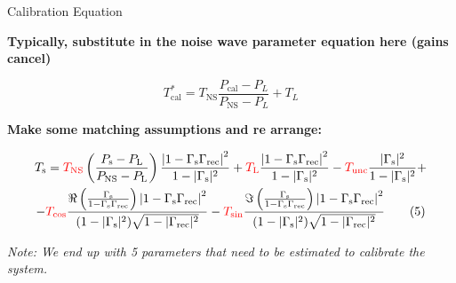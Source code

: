 \documentclass[aspectratio=169]{beamer}
\begin{document}
\begin{frame}{\small{Calibration Equation}}

	\vspace{0.2cm} %

	\textbf{Typically, substitute in the noise wave parameter equation here (gains cancel)}

	\vspace{0.2cm} %

	{\tiny
		\begin{equation}
			T_{\text{cal}}^* = T_{\text{NS}} \frac{P_{\text{cal}} - P_L}{P_{\text{NS}} - P_L} + T_L \tag{4}
		\end{equation}
	}

	\vspace{0.1cm} %

	\textbf{Make some matching assumptions and re arrange:}

	\vspace{0.1cm} %

	{\tiny
		\begin{multline}
			T_\mathrm{s} = \textcolor{red}{T_\mathrm{NS}}\left(\frac{P_\mathrm{s} - P_\mathrm{L}}{P_\mathrm{NS} - P_\mathrm{L}}\right)\frac{\left|1 - \Gamma_\mathrm{s}\Gamma_\mathrm{rec}\right|^2}{1 - |\Gamma_\mathrm{s}|^2} + \textcolor{red}{T_\mathrm{L}}\frac{\left|1 - \Gamma_\mathrm{s}\Gamma_\mathrm{rec}\right|^2}{1 - |\Gamma_\mathrm{s}|^2} - \textcolor{red}{T_\mathrm{unc}} \frac{|\Gamma_\mathrm{s}|^2}{1 - |\Gamma_\mathrm{s}|^2} +  \\
			-\textcolor{red}{T_\mathrm{cos}} \frac{\Re \left( \frac{\Gamma_\mathrm{s}}{1 - \Gamma_\mathrm{s}\Gamma_\mathrm{rec}} \right)\left|1 - \Gamma_\mathrm{s}\Gamma_\mathrm{rec}\right|^2}{(1 - |\Gamma_\mathrm{s}|^2) \sqrt{1 - |\Gamma_\mathrm{rec}|^2}}  -\textcolor{red}{T_\mathrm{sin}} \frac{\Im \left( \frac{\Gamma_\mathrm{s}}{1 - \Gamma_\mathrm{s}\Gamma_\mathrm{rec}} \right)\left|1 - \Gamma_\mathrm{s}\Gamma_\mathrm{rec}\right|^2}{(1 - |\Gamma_\mathrm{s}|^2) \sqrt{1 - |\Gamma_\mathrm{rec}|^2}} \tag{5}
		\end{multline}
	}

	\textit{Note: We end up with 5 parameters that need to be estimated to calibrate the system.}

	\vfill %
\end{frame}
\end{document}
